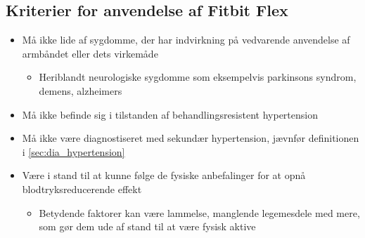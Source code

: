 \subsection*{Kriterier for anvendelse af Fitbit Flex}
\begin{itemize}
\item Må ikke lide af sygdomme, der har indvirkning på vedvarende anvendelse af armbåndet eller dets virkemåde 
	\begin{itemize}
	\item Heriblandt neurologiske sygdomme som eksempelvis parkinsons syndrom, demens, alzheimers
	\end{itemize}

\item Må ikke befinde sig i tilstanden af behandlingsresistent hypertension 

\item Må ikke være diagnostiseret med sekundær hypertension, jævnfør definitionen i \autoref{sec:dia_hypertension} %

\item Være i stand til at kunne følge de fysiske anbefalinger for at opnå blodtryksreducerende effekt 
	\begin{itemize}
	\item Betydende faktorer kan være lammelse, manglende legemesdele med mere, som gør dem ude af stand til at være fysisk aktive 
	\end{itemize}  

\end{itemize}




